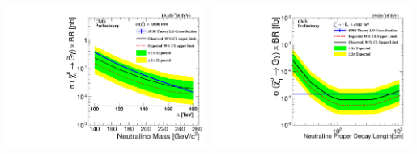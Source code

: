 \begin{center}
\includegraphics[width=0.49\textwidth,height=0.5\textwidth]{THESISPLOTS/Neutralino_CrosSecVsMass_Exclusion_limit_12000.pdf}
\includegraphics[width=0.49\textwidth,height=0.5\textwidth]{THESISPLOTS/180TeV_Neutralino_CrossSecTimesBR_Uplimit.pdf}
\label{fig:limits}
\end{center}


